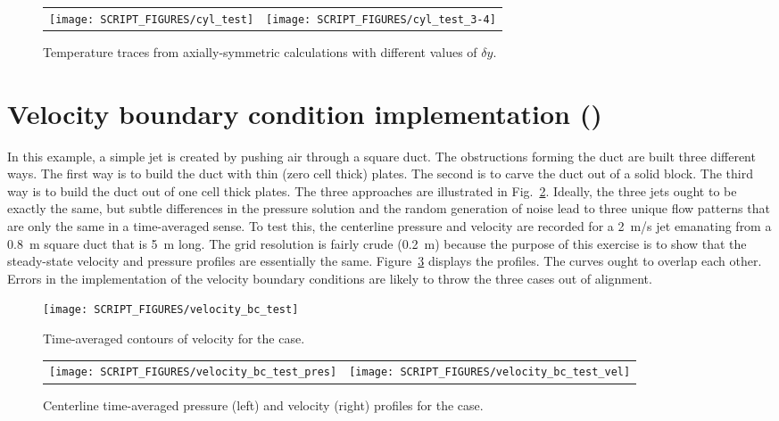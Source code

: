 \documentclass[11pt]{book}
\begin{document}
\begin{figure}[!ht]
\begin{tabular*}{\textwidth}{lr}
\texttt{[image: SCRIPT\_FIGURES/cyl\_test]} &
\texttt{[image: SCRIPT\_FIGURES/cyl\_test\_3-4]}
\end{tabular*}
\caption[The  test cases]{Temperature traces from axially-symmetric calculations with different values of $\delta y$.}
\label{cyl_test_fig}
\end{figure}

\section{Velocity boundary condition implementation (\texorpdfstring{}{velocity\_bc\_test})}
\label{velocity_bc_test}

In this example, a simple jet is created by pushing air through a square duct. The obstructions forming the duct are built three different ways. The first way is to build the duct with thin (zero cell thick) plates. The second is to carve the duct out of a solid block. The third way is to build the duct out of one cell thick plates. The three approaches are illustrated in Fig.~\ref{velocity_bc_test_image}. Ideally, the three jets ought to be exactly the same, but subtle differences in the pressure solution and the random generation of noise lead to three unique flow patterns that are only the same in a time-averaged sense. To test this, the centerline pressure and velocity are recorded for a 2~m/s jet emanating from a 0.8~m square duct that is 5~m long. The grid resolution is fairly crude (0.2~m) because the purpose of this exercise is to show that the steady-state velocity and pressure profiles are essentially the same. Figure~\ref{velocity_bc_test_plot} displays the profiles. The curves ought to overlap each other. Errors in the implementation of the velocity boundary conditions are likely to throw the three cases out of alignment.

\begin{figure}[!ht]
\centering
\texttt{[image: SCRIPT\_FIGURES/velocity\_bc\_test]}
\caption[Images of the  test case]{Time-averaged contours of velocity for the  case.}
\label{velocity_bc_test_image}
\end{figure}

\begin{figure}[!ht]
\begin{tabular*}{\textwidth}{lr}
\texttt{[image: SCRIPT\_FIGURES/velocity\_bc\_test\_pres]} &
\texttt{[image: SCRIPT\_FIGURES/velocity\_bc\_test\_vel]}
\end{tabular*}
\caption[The  test case]{Centerline time-averaged pressure (left) and velocity (right) profiles for the  case.}
\label{velocity_bc_test_plot}
\end{figure}
\end{document}
